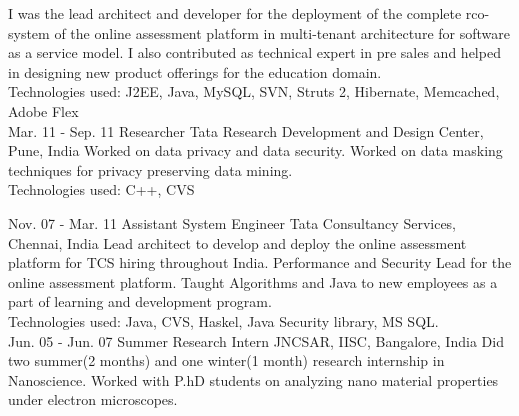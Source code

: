 \documentclass[]{cv-class}
\begin{document}
\begin{entrylist}
{		I was the lead architect and developer for the deployment of the complete rco-system of the online assessment platform in multi-tenant architecture for software as a service model. I also contributed as technical expert in pre sales and helped in designing new product offerings for the education domain. \\
    Technologies used: J2EE, Java, MySQL, SVN, Struts 2, Hibernate, Memcached, Adobe Flex\\}
  \entry
    {Mar. 11 - Sep. 11}
    {Researcher}
    {Tata Research Development and Design Center, Pune, India}
    {Worked on data privacy and data security. Worked on data masking techniques for privacy preserving data mining. \\
     Technologies used: C++, CVS\\}

\end{entrylist}
\newpage

\begin{entrylist}
  \entry
    {Nov. 07 - Mar. 11}
    {Assistant System Engineer}
    {Tata Consultancy Services, Chennai, India}
    {Lead architect to develop and deploy the online assessment platform for TCS hiring throughout India. 
 Performance and Security Lead for the online assessment platform. Taught Algorithms and Java to new employees as a part of learning and development program.\\
  Technologies used: Java, CVS, Haskel, Java Security library, MS SQL.\\}
  \entry
    {Jun. 05 - Jun. 07}
    {Summer Research Intern}
    {JNCSAR, IISC, Bangalore, India}
    {
    Did two summer(2 months) and one winter(1 month) research internship in Nanoscience.
    Worked with P.hD students on analyzing nano material properties under electron microscopes.\\}
\end{entrylist}
\end{document}
